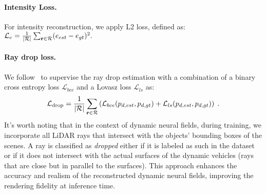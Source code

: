 \paragraph{Intensity Loss.}
For intensity reconstruction, we apply L2 loss, defined as: $\mathcal{L}_{e} = \frac{1}{|\mathcal{R}|}\sum_{\mathbf{r} \in \mathcal{R}}(e_{est} -e_{gt})^2.$


\paragraph{Ray drop loss.}
We follow~\cite{Huang2023nfl} to supervise the ray drop estimation with a combination of a binary cross entropy loss $\mathcal{L}_{bce}$ and a Lovasz loss $\mathcal{L}_{ls}$ \cite{berman2018lovasz} as:
\begin{equation}
     \mathcal{L}_{\text{drop}} = \frac{1}{|\mathcal{R}|} \sum_{\mathbf{r} \in \mathcal{R}} \left(\mathcal{L}_{bce}(p_{d, est}, {p_{d, gt}}) + \mathcal{L}_{ls}(p_{d, est}, {p_{d, gt}}) \right)\;.
     \label{eq:raydrop_loss}
\end{equation}
It's worth noting that in the context of dynamic neural fields, during training, we incorporate all LiDAR rays that intersect with the objects' bounding boxes of the scenes. A ray is classified as \textit{dropped} either if it is labeled as such in the dataset or if it does not intersect with the actual surfaces of the dynamic vehicles (\eg rays that are close but in parallel to the surfaces). This approach enhances the accuracy and realism of the reconstructed dynamic neural fields, improving the rendering fidelity at inference time. 
